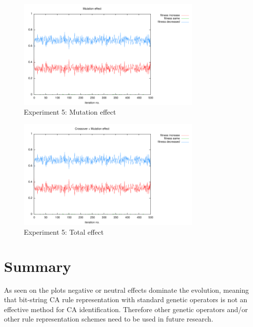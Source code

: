 \documentclass[12pt,a4paper]{article}
\begin{document}
\begin{figure}
\centering
\includegraphics[width=0.8\textwidth]{results/5/1-ms.pdf}
\caption{Experiment 5: Mutation effect}
\label{pic-e5-ms}
\end{figure}

\begin{figure}
\centering
\includegraphics[width=0.8\textwidth]{results/5/1-cms.pdf}
\caption{Experiment 5: Total effect}
\label{pic-e5-cms}
\end{figure}

\section{Summary}
As seen on the plots negative or neutral effects dominate the evolution, meaning that bit-string CA rule representation with standard genetic operators is not an effective method for CA identification. Therefore other genetic operators and/or other rule representation schemes need to be used in future research.
\end{document}
